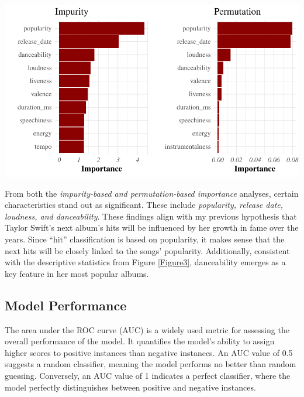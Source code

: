\documentclass[11pt,preprint, authoryear]{elsarticle}
\let\origfigure\figure
\let\endorigfigure\endfigure
\renewenvironment{figure}[1][2] {
    \expandafter\origfigure\expandafter[H]
} {
    \endorigfigure
}
\numberwithin{equation}{section}
\numberwithin{figure}{section}
\numberwithin{table}{section}
\begin{document}
\begin{figure}[H]

{\centering \includegraphics{Taylor-Swift-Report_files/figure-latex/Figure4-1} 

}

\caption{Impurity-based and Permutation-based Performance \label{Figure4}}\label{fig:Figure4}
\end{figure}

From both the \emph{impurity-based and permutation-based importance}
analyses, certain characteristics stand out as significant. These
include \emph{popularity, release date, loudness, and danceability}.
These findings align with my previous hypothesis that Taylor Swift's
next album's hits will be influenced by her growth in fame over the
years. Since ``hit'' classification is based on popularity, it makes
sense that the next hits will be closely linked to the songs'
popularity. Additionally, consistent with the descriptive statistics
from Figure \ref{Figure3}, danceability emerges as a key feature in her
most popular albums.

\hypertarget{model-performance}{%
\subsection*{Model Performance}\label{model-performance}}

The area under the ROC curve (AUC) is a widely used metric for assessing
the overall performance of the model. It quantifies the model's ability
to assign higher scores to positive instances than negative instances.
An AUC value of 0.5 suggests a random classifier, meaning the model
performs no better than random guessing. Conversely, an AUC value of 1
indicates a perfect classifier, where the model perfectly distinguishes
between positive and negative instances.
\end{document}
